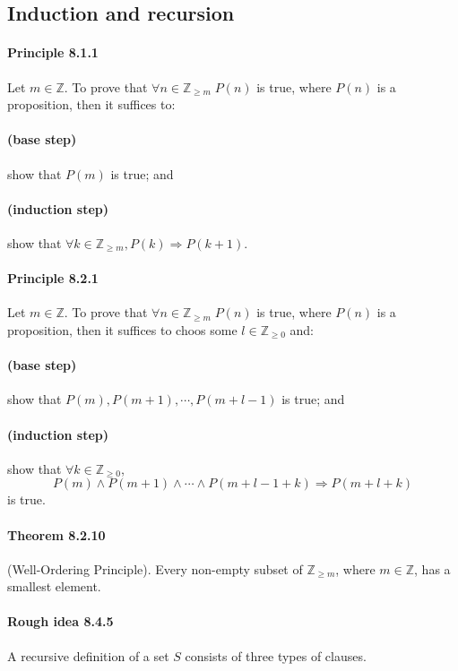 \documentclass[a4paper]{article}
\newcommand{\Z}{\mathbb{Z}}
\begin{document}
\begin{multicols*}{3}
  \footnotesize
  \subsection*{Induction and recursion}
    \paragraph{Principle 8.1.1}
      Let $m \in \Z$. To prove that $\forall n \in \Z_{\geq m} \; P(n)$ is true, where $P(n)$ is a proposition, then it suffices to:
      \paragraph{(base step)} show that $P(m)$ is true; and
      \paragraph{(induction step)} show that $\forall k \in \Z_{\geq m}, P(k) \Rightarrow P(k+1)$.
    \paragraph{Principle 8.2.1}
      Let $m \in \Z$. To prove that $\forall n \in \Z_{\geq m} \; P(n)$ is true, where $P(n)$ is a proposition, then it suffices to choos some $l \in \Z_{\geq 0}$ and:
      \paragraph{(base step)} show that $P(m), P(m+1), \cdots, P(m+l-1)$ is true; and
      \paragraph{(induction step)} show that $\forall k \in \Z_{\geq 0}$,
        \begin{equation*}
          P(m) \land P(m+1) \land \cdots \land P(m+l-1+k) \Rightarrow P(m+l+k)
        \end{equation*}
        is true.
    \paragraph{Theorem 8.2.10} (Well-Ordering Principle). Every non-empty subset of $\Z_{\geq m}$, where $m \in \Z$, has a smallest element.
    \paragraph{Rough idea 8.4.5} A recursive definition of a set $S$ consists of three types of clauses.

\end{multicols*}
\end{document}

